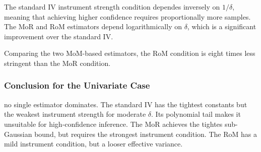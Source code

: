 The standard IV instrument strength condition dependes inversely on $1/\delta$, meaning that achieving higher confidence requires proportionally more samples.
The MoR and RoM estimators depend logarithmically on $\delta$, which is a significant improvement over the standard IV.

Comparing the two MoM-based estimators, the RoM condition is eight times less stringent than the MoR condition.

\subsubsection{Conclusion for the Univariate Case}

no single estimator dominates. The standard IV has the tightest constants but the weakest instrument strength for moderate $\delta$. Its polynomial tail makes it unsuitable for high-confidence inference. The MoR achieves the tightes sub-Gaussian bound, but requires the strongest instrument condition. The RoM has a mild instrument condition, but a looser effective variance.